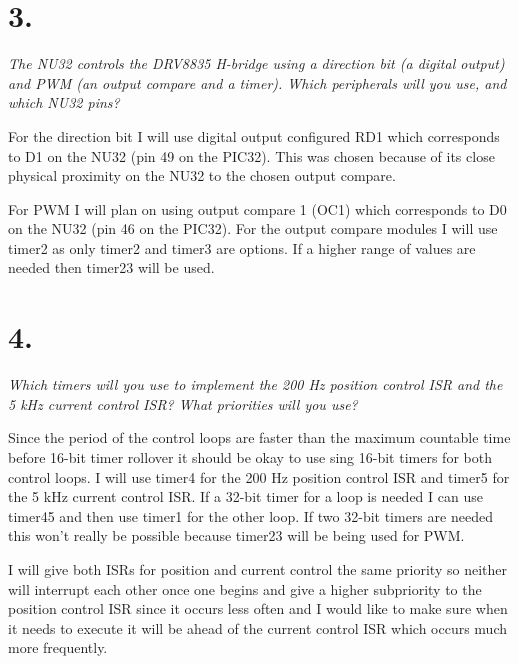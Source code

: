 \documentclass[12pt]{article}
\begin{document}

\section*{3.}
\textit{The NU32 controls the DRV8835 H-bridge using a direction bit (a digital output) and PWM (an output compare and a timer). Which peripherals will you use, and which NU32 pins?}

For the direction bit I will use digital output configured RD1 which corresponds to D1 on the NU32 (pin 49 on the PIC32). 
This was chosen because of its close physical proximity on the NU32 to the chosen output compare.

For PWM I will plan on using output compare 1 (OC1) which corresponds to D0 on the NU32 (pin 46 on the PIC32).
For the output compare modules I will use timer2 as only timer2 and timer3 are options.
If a higher range of values are needed then timer23 will be used.

\section*{4.}
\textit{Which timers will you use to implement the 200 Hz position control ISR and the 5 kHz current control ISR? What priorities will you use?}

Since the period of the control loops are faster than the maximum countable time before 16-bit timer rollover it should be okay to use sing 16-bit timers for both control loops.
I will use timer4 for the 200 Hz position control ISR and timer5 for the 5 kHz current control ISR. 
If a 32-bit timer for a loop is needed I can use timer45 and then use timer1 for the other loop.
If two 32-bit timers are needed this won't really be possible because timer23 will be being used for PWM.

I will give both ISRs for position and current control the same priority so neither will interrupt each other once one begins and give a higher subpriority to the position control ISR since it occurs less often and I would like to make sure when it needs to execute it will be ahead of the current control ISR which occurs much more frequently.
\end{document}
